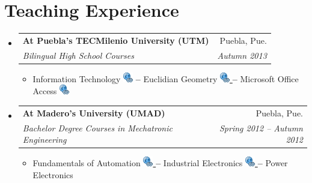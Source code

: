 \documentclass[10pt]{article}
\makeatletter
\newcommand{\resitem}[1]{\item #1 \vspace{-2pt}}
\newcommand{\ressubheading}[4]{
\begin{tabular*}{6.5in}{l@{\extracolsep{\fill}}r}
		\textbf{#1} & #2 \\
		\textit{#3} & \textit{#4} \\
\end{tabular*}\vspace{-6pt}}
\makeatother
\begin{document}
    
    
   

           
    \section*{Teaching Experience}
	\begin{itemize}

		\item 
		\ressubheading{At Puebla's TECMilenio University (UTM)}{Puebla, Pue.}{Bilingual High School Courses}{Autumn 2013}
		{ \footnotesize
		\begin{itemize}
		\resitem{ Information Technology \href{https://sites.google.com/site/perezxochicale/teaching/iit}{ \includegraphics[scale=.3]{link_url_icon}} %
		\color{white}{d d} \color{black}{} \textbf{--} Euclidian Geometry \href{https://sites.google.com/site/perezxochicale/teaching/euclidean-geometry}{\includegraphics[scale=.3]{link_url_icon} } 
		\color{white}{d d} \color{black}{} \textbf{--} Microsoft Office Access \href{https://sites.google.com/site/perezxochicale/teaching/moa}{\includegraphics[scale=.3]{link_url_icon} } 
		}
		\end{itemize}
		}
		
		\item 
		\ressubheading{At Madero's University (UMAD)}{Puebla, Pue.}{Bachelor Degree Courses in Mechatronic Engineering}{Spring 2012 -- Autumn 2012}
				{ \footnotesize
				\begin{itemize}
				\resitem{Fundamentals of Automation \href{https://sites.google.com/site/perezxochicale/digital-electronics}{ \includegraphics[scale=.3]{link_url_icon} }
				\color{white}{d d} \color{black}{} \textbf{--} Industrial Electronics \href{https://sites.google.com/site/perezxochicale/ie}{\includegraphics[scale=.3]{link_url_icon} }
				\color{white}{d d} \color{black}{} \textbf{--} Power Electronics
				} 
				

\end{itemize}}
\end{itemize}
\end{document}
